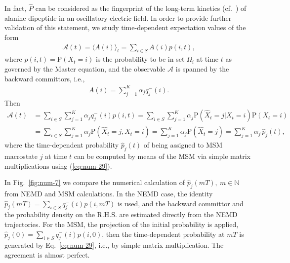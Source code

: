 \documentclass[journal=jctcce,manuscript=article]{achemso}
\newcommand{\recheck}[1]{{\color{red} #1}}
\newcommand{\bwd}[0]{-}
\newcommand{\prob}{\textrm{P}}
\begin{document}
In fact, $\hat{P}$ can be considered as the fingerprint of the long-term kinetics (cf.~\cite{A19-39,PrinzKellerNoe_PCCP11_Perspective}) of alanine dipeptide in an oscillatory electric field.
In order to provide further validation of this statement, we study  time-dependent expectation values of
the form
\begin{align}
  \mathcal A(t) = \langle A(i)\rangle_t = \sum_{i\in S} A(i) p(i,t),
\end{align}
where $p(i,t)=\prob(X_t=i)$ is the probability to be in set $\Omega_i$ at time $t$ as governed by the Master equation, and the observable $\mathcal A$ is  spanned by the backward
committors, i.e.,
\begin{align}\label{A}
  A(i) = \sum_{j=1}^K \alpha_j q^\bwd_j(i).
\end{align}
Then
\begin{align}\nonumber
  \mathcal A(t) &=
  \sum_{i\in S} \sum_{j=1}^K \alpha_j q^\bwd_j(i)  p(i,t)=\sum_{i\in S} \sum_{j=1}^K \alpha_j \prob (\hat X_t = j \vert X_t = i) \prob (X_t = i) \\
  & =
  \sum_{i\in S} \sum_{j=1}^K \alpha_j \prob (\hat X_t = j ,X_t = i)  =
  \sum_{j=1}^K \alpha_j \prob (\hat X_t = j) 
 =
   \sum_{j=1}^K \alpha_j \,\hat p_j (t), \label{eq:num-28}
\end{align}
where the time-dependent probability $\hat{p}_j(t)$ of being assigned to MSM macrostate $j$ at time $t$ can be computed  by means of the MSM via simple matrix multiplications using (\ref{eq:num-29}).

In Fig.~\ref{fig:num-7} we compare the numerical calculation of $\hat p_j (mT), \ m\in\mathbb N$ from NEMD and MSM calculations.
In the NEMD case, the identity  $\hat p_j (mT) = \sum_{i\in S}  q^\bwd_j(i)  p(i,mT) $ is used, and
the backward committor and the probability density on the R.H.S.
are estimated directly from the
NEMD trajectories. For the MSM, the projection of the initial probability is applied, $\hat p_j (0) = \sum_{i\in S}  q^\bwd_j(i)  p(i,0) $, then
the time-dependent probability at $mT$ is generated by Eq.~\eqref{eq:num-29}, i.e., by simple matrix multiplication. The agreement is almost perfect.

\end{document}

